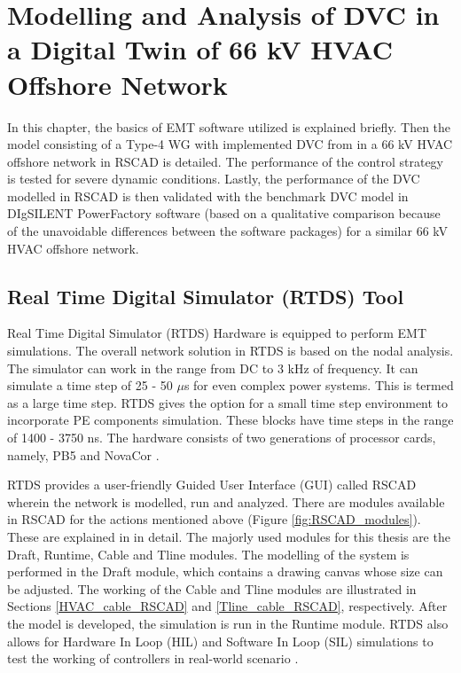 \chapter{Modelling and Analysis of DVC in a Digital Twin of 66 kV HVAC Offshore Network}\label{3}

In this chapter, the basics of \gls{EMT} software utilized is explained briefly. Then the model consisting of a Type-4 \gls{WG} with implemented \gls{DVC} from \cite{korai_dynamic_2019} in a 66 kV \gls{HVAC} offshore network in RSCAD is detailed. The performance of the control strategy is tested for severe dynamic conditions. Lastly, the performance of the \gls{DVC} modelled in RSCAD is then validated with the benchmark \gls{DVC} model in DIgSILENT PowerFactory software \cite{erlich_description_2018} (based on a qualitative comparison because of the unavoidable differences between the software packages) for a similar 66 kV \gls{HVAC} offshore network.

\section{Real Time Digital Simulator (RTDS) Tool}\label{RTDS_Theory}
Real Time Digital Simulator (\gls{RTDS}) Hardware is equipped to perform \gls{EMT} simulations. The overall network solution in \gls{RTDS} is based on the nodal analysis. The simulator can work in the range from \gls{DC} to 3 kHz of frequency. It can simulate a time step of 25 - 50 $\mu$s for even complex power systems. This is termed as a large time step. \gls{RTDS} gives the option for a small time step environment to incorporate \gls{PE} components simulation. These blocks have time steps in the range of 1400  - 3750 ns. The hardware consists of two generations of processor cards, namely, PB5 and NovaCor \cite{rtds_tech}.  

\gls{RTDS} provides a user-friendly Guided User Interface (GUI) called RSCAD wherein the network is modelled, run and analyzed. There are modules available in RSCAD for the actions mentioned above (Figure \ref{fig:RSCAD_modules}). These are explained in \cite{rtds_tech} in detail. The majorly used modules for this thesis are the Draft, Runtime, Cable and Tline modules. The modelling of the system is performed in the Draft module, which contains a drawing canvas whose size can be adjusted. The working of the Cable and Tline modules are illustrated in Sections \ref{HVAC_cable_RSCAD} and \ref{Tline_cable_RSCAD}, respectively. After the model is developed, the simulation is run in the Runtime module. \gls{RTDS} also allows for Hardware In Loop (HIL) and Software In Loop (SIL) simulations to test the working of controllers in real-world scenario \cite{rtds_tech_hardware}.

